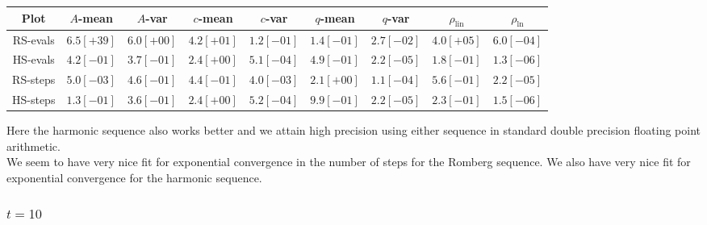 \begin{table}[H]
    \centering
    \small
    \begin{tabular}{c||c|c|c|c|c|c|c|c}
Plot & \(A\)-mean & \(A\)-var & \(c\)-mean & \(c\)-var & \(q\)-mean & \(q\)-var & \(\rho_{\operatorname{lin}}\) & \(\rho_{\ln}\)\\\hline
\rowcolor{red}
RS-evals & \(6.5[+39]\) & \(6.0[+00]\) & \(4.2[+01]\) & \(1.2[-01]\) & \(1.4[-01]\) & \(2.7[-02]\) & \(4.0[+05]\) & \(6.0[-04]\) \\
\rowcolor{green}
HS-evals & \(4.2[-01]\) & \(3.7[-01]\) & \(2.4[+00]\) & \(5.1[-04]\) & \(4.9[-01]\) & \(2.2[-05]\) & \(1.8[-01]\) & \(1.3[-06]\) \\
\rowcolor{green}
RS-steps & \(5.0[-03]\) & \(4.6[-01]\) & \(4.4[-01]\) & \(4.0[-03]\) & \(2.1[+00]\) & \(1.1[-04]\) & \(5.6[-01]\) & \(2.2[-05]\) \\
\rowcolor{green}
HS-steps & \(1.3[-01]\) & \(3.6[-01]\) & \(2.4[+00]\) & \(5.2[-04]\) & \(9.9[-01]\) & \(2.2[-05]\) & \(2.3[-01]\) & \(1.5[-06]\) \\
    \end{tabular}
    \label{tab:my_label}
\end{table}

Here the harmonic sequence also works better and we attain high precision using either sequence in standard double precision floating point arithmetic.\\

We seem to have very nice fit for exponential convergence in the number of steps for the Romberg sequence. We also have very nice fit for exponential convergence for the harmonic sequence.

\subsubsection{\(t = 10\)}

